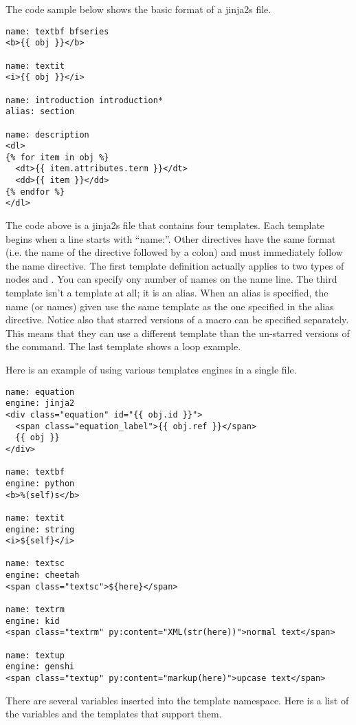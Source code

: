 The code sample below shows the basic format of a jinja2s file.
\begin{verbatim}
name: textbf bfseries
<b>{{ obj }}</b>

name: textit
<i>{{ obj }}</i>

name: introduction introduction*
alias: section

name: description
<dl>
{% for item in obj %}
  <dt>{{ item.attributes.term }}</dt>
  <dd>{{ item }}</dd>
{% endfor %}
</dl>
\end{verbatim}

The code above is a jinja2s file that contains four templates.  Each template
begins when a line starts with ``name:''.  Other directives have the same
format (i.e. the name of the directive followed by a colon) and must
immediately follow the name directive.  The first template definition
actually applies to two types of nodes  and .
You can specify ony number of names on the name line.  The third template
isn't a template at all; it is an alias.  When an alias is specified,
the name (or names) given use the same template as the one specified
in the alias directive. Notice also that starred versions of a macro
can be specified separately. This means that they can use a different
template than the un-starred versions of the command.
The last template shows a loop example.

Here is an example of using various templates engines in a single file.
\begin{verbatim}
name: equation
engine: jinja2
<div class="equation" id="{{ obj.id }}">
  <span class="equation_label">{{ obj.ref }}</span>
  {{ obj }}
</div>

name: textbf
engine: python
<b>%(self)s</b>

name: textit
engine: string
<i>${self}</i>

name: textsc
engine: cheetah
<span class="textsc">${here}</span>

name: textrm
engine: kid
<span class="textrm" py:content="XML(str(here))">normal text</span>

name: textup
engine: genshi
<span class="textup" py:content="markup(here)">upcase text</span>
\end{verbatim}

There are several variables inserted into the template namespace.  Here is
a list of the variables and the templates that support them.

